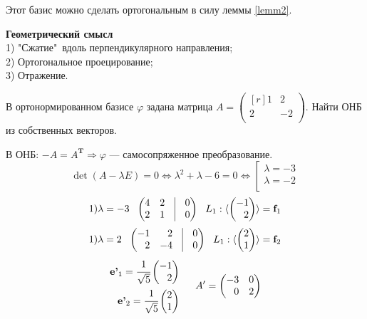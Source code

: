Этот базис можно сделать ортогональным в силу леммы \ref{lemm2}.

\textbf{Геометрический смысл}\\
1) "Сжатие"\ вдоль перпендикулярного направления;\\
2) Ортогональное проецирование;\\
3) Отражение.
\begin{prim}
В ортонормированном базисе $\varphi$ задана матрица $ A=
\left(
\begin{matrix*}[r]
1 & 2\\ 
2 & -2\\
\end{matrix*}
\right). 
$
Найти ОНБ из собственных векторов.
\end{prim}
В ОНБ: $-A=A^{\textbf{T}} \Rightarrow \varphi$ --- самосопряженное преобразование.\\
$$
\det (A-\lambda E)=0 \Leftrightarrow \lambda^2 +\lambda -6=0  \Leftrightarrow
\left[
\begin{aligned}
\lambda=-3\\
\lambda=-2\\
\end{aligned}
\right.
$$
$$
1) \lambda=-3 \:\:\: 
\begin{pmatrix*}[r]
 4 & 2 & \vrule & 0\\
 2 & 1 & \vrule & 0\\
\end{pmatrix*}
\:\:\:  
L_1:
 \langle \left(
\begin{matrix*}[r]
-1\\ 2\\ 
\end{matrix*}
\right) \rangle
=\textbf{f}_1
$$
$$
1) \lambda=2 \:\:\: 
\begin{pmatrix*}[r]
 -1 & 2 & \vrule & 0\\
 2 & -4 & \vrule & 0\\
\end{pmatrix*}
\:\:\:  
L_1:
 \langle \left(
\begin{matrix*}[r]
2\\ 1\\ 
\end{matrix*}
\right) \rangle
=\textbf{f}_2
$$
$$
\left.
\begin{aligned}
\textbf{e'}_1 =\cfrac{1}{\sqrt{5}}
\begin{pmatrix*}[r]
-1\\ 2\\ 
\end{pmatrix*}
 \\
\textbf{e'}_2 =\cfrac{1}{\sqrt{5}}
\begin{pmatrix*}[r]
2\\ 1\\ 
\end{pmatrix*}
 \\
\end{aligned}
\right.
 \:\:\:\:\:\: A'=
\begin{pmatrix*}[r]
 -3 & 0 \\
 0 & 2 \\
\end{pmatrix*}
$$
